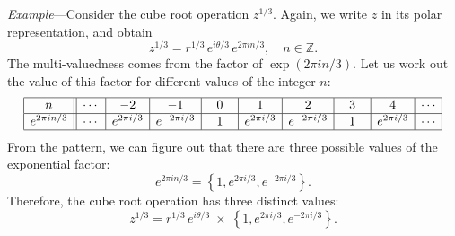 \documentclass[10pt,a4paper]{article}
\begin{document}
\begin{framed} \noindent
  \textit{Example}---Consider the cube root operation
  $z^{1/3}$. Again, we write $z$ in its polar representation, and
  obtain
\begin{equation}
z^{1/3} = r^{1/3} \, e^{i\theta/3} \, e^{2\pi i n/3}, \quad n \in \mathbb{Z}.
\end{equation}
The multi-valuedness comes from the factor of $\exp(2\pi i n/3)$. Let
us work out the value of this factor for different values of the integer
$n$:
\begin{equation*}
\begin{array}{|c||c|c|c|c|c|c|c|c|c|} \hline n &\cdots & -2 & -1 & 0 & 1 & 2 & 3 & 4 & \cdots \\ \hline e^{2\pi i n/3} &\cdots & e^{2\pi i /3} & e^{-2\pi i /3} & \;\,\;1\;\,\; & e^{2\pi i /3} & e^{-2\pi i /3} & \;\,\;1\;\,\; & e^{2\pi i /3} & \cdots \\ \hline \end{array}
\end{equation*}
From the pattern, we can figure out that there are three possible values
of the exponential factor:
\begin{equation}
e^{2\pi i n/3} = \left\{1, e^{2\pi i /3}, e^{-2\pi i /3}\right\}.
\end{equation}
Therefore, the cube root operation has three distinct values:
\begin{equation}
z^{1/3} = r^{1/3} \, e^{i\theta/3} \;\times\; \left\{1, e^{2\pi i /3}, e^{-2\pi i /3}\right\}.
\end{equation}
\end{framed}
\end{document}
